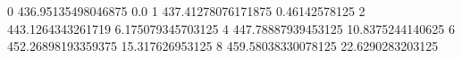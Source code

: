 0 436.95135498046875 0.0
1 437.41278076171875 0.46142578125
2 443.1264343261719 6.175079345703125
4 447.78887939453125 10.8375244140625
6 452.26898193359375 15.317626953125
8 459.58038330078125 22.6290283203125
